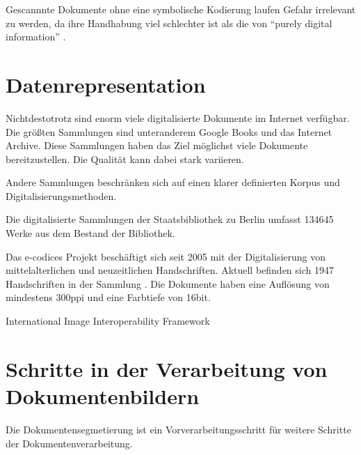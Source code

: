 Gescannnte Dokumente ohne eine symbolische Kodierung laufen Gefahr irrelevant zu werden,
da ihre Handhabung viel schlechter ist als die von ``purely digital information'' \parencite[10]{BairdDigitallibrariesdocument2003}.
 
\section{Datenrepresentation}

Nichtdestotrotz sind enorm viele digitalisierte Dokumente im Internet verfügbar.
Die größten Sammlungen sind unteranderem Google Books und das Internet Archive.
Diese Sammlungen haben das Ziel möglichst viele Dokumente bereitzustellen. 
Die Qualität kann dabei stark variieren.

Andere Sammlungen beschränken sich auf einen klarer definierten Korpus und Digitalisierungsmethoden.

Die digitalisierte Sammlungen der Staatsbibliothek zu Berlin \parencite{StaatsbibliothekzuBerlinDigitalisierteSammlungenStaatsbibliothek2016} umfasst 134645 Werke aus dem Bestand der Bibliothek.

Das e-codices Projekt beschäftigt sich seit 2005 mit der Digitalisierung von mittelalterlichen und neuzeitlichen Handschriften. 
Aktuell befinden sich 1947 Handschriften in der Sammlung \parencite{e-codicesecodicesVirtuelleHandschriftenbibliothek2018}. 
Die Dokumente haben eine Auflösung von mindestens 300ppi und eine Farbtiefe von 16bit. 


International Image Interoperability Framework \cite{IIIFInternationalImageInteroperability2018}


\section{Schritte in der Verarbeitung von Dokumentenbildern}
Die Dokumentensegmetierung ist ein Vorverarbeitungsschritt für weitere Schritte der Dokumentenverarbeitung.

